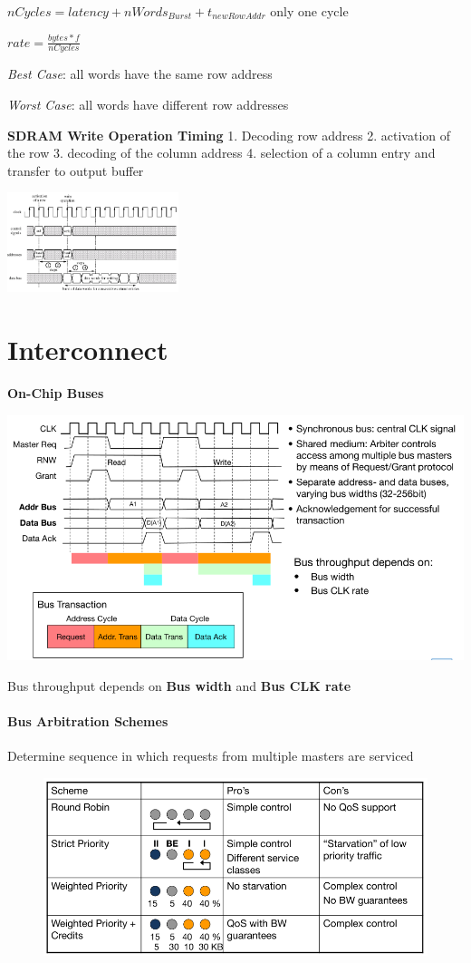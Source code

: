 \documentclass[english]{latex4ei/latex4ei_sheet}
\begin{document}
$nCycles = latency + nWords_{Burst} + t_{newRowAddr}$ \quad only one cycle

$rate = \frac{bytes * f}{nCycles}$

\textit{Best Case}: all words have the same row address

\textit{Worst Case}: all words have different row addresses

\textbf{SDRAM Write Operation Timing}
1. Decoding row address 2. activation of the row 3. decoding of the column address 4. selection of a column entry and transfer to output buffer
\begin{center}
	\includegraphics[width=5cm]{images//5.Memory/SDRAMWrite.png}
\end{center}

\section{Interconnect}

\textbf{On-Chip Buses}
\begin{center}
	\includegraphics[width=0.8\linewidth]{images//6.Interconnects/OnChipBasicOperation.png}
\end{center}
Bus throughput depends on \textbf{Bus width} and \textbf{Bus CLK rate}

\paragraph{Bus Arbitration Schemes} Determine sequence in which requests from multiple masters are serviced
\begin{figure}
	\centering
	\includegraphics[width=1\linewidth]{images//6.Interconnects/BusArbitrationSchemes.png}
\end{figure}
\end{document}
